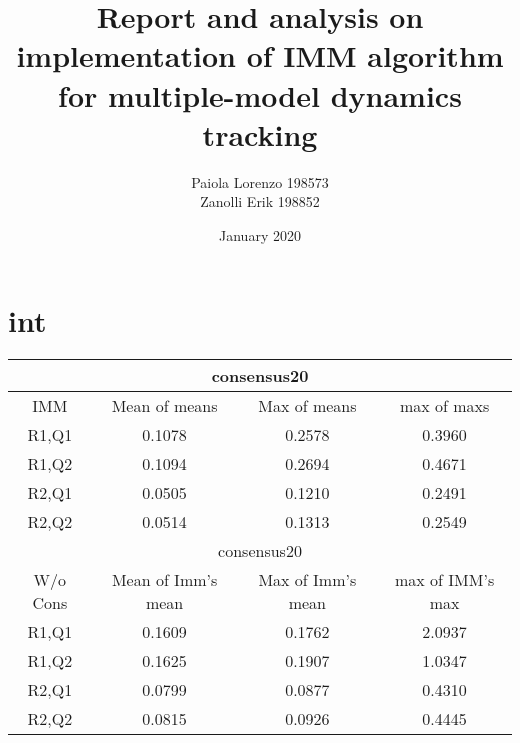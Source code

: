 \documentclass[twocolumn]{article}
\title{Report and analysis on implementation of IMM algorithm for multiple-model dynamics tracking}
\author{
    Paiola Lorenzo 198573 
    
    Zanolli Erik 198852}
\date{January 2020}
\begin{document}
    
    \maketitle
\section*{int}
\begin{center}
    \begin{tabular}{ |c||c|c|c|  }
        \hline
        \multicolumn{4}{|c|}{consensus20} \\
        \hline
        IMM  & Mean of means    & Max of means     & max of maxs  \\ [0.5ex]
        \hline
        R1,Q1           & 0.1078                & 0.2578                & 0.3960                 \\
            \hline
            R1,Q2           & 0.1094                & 0.2694             & 0.4671                      \\
            \hline
            R2,Q1           & 0.0505                &  0.1210           & 0.2491                         \\
            \hline
            R2,Q2           & 0.0514                & 0.1313             & 0.2549                   \\
        \hline
        \multicolumn{4}{|c|}{consensus20} \\
        \hline
        W/o Cons  & Mean of Imm's mean    & Max of Imm's mean     & max of IMM's max  \\ 
        \hline
        R1,Q1           & 0.1609                & 0.1762                & 2.0937                 \\
        \hline
        R1,Q2           & 0.1625                & 0.1907             & 1.0347                     \\
        \hline
        R2,Q1           & 0.0799               &  0.0877           & 0.4310                         \\
        \hline
        R2,Q2           & 0.0815                & 0.0926            & 0.4445                   \\
    \hline
       \end{tabular}
    \end{center}


































\end{document}
